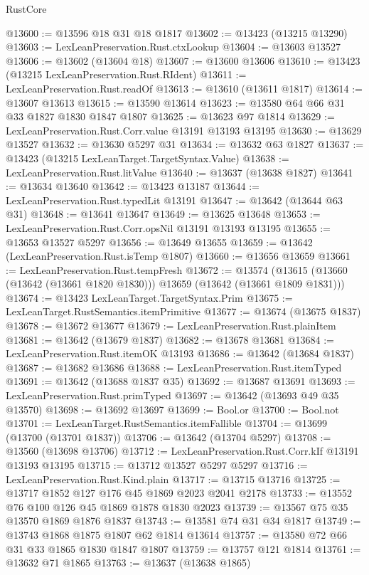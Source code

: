 \begin{lexlean}{RustCore}
\begin{coremodule}
@13600 := @13596 @18 @31 @18 @1817
@13602 := @13423 (@13215 @13290)
@13603 := LexLeanPreservation.Rust.ctxLookup
@13604 := @13603 @13527
@13606 := @13602 (@13604 @18)
@13607 := @13600 @13606
@13610 := @13423 (@13215 LexLeanPreservation.Rust.RIdent)
@13611 := LexLeanPreservation.Rust.readOf
@13613 := @13610 (@13611 @1817)
@13614 := @13607 @13613
@13615 := @13590 @13614
@13623 := @13580 @64 @66 @31 @33 @1827 @1830 @1847 @1807
@13625 := @13623 @97 @1814
@13629 := LexLeanPreservation.Rust.Corr.value @13191 @13193 @13195
@13630 := @13629 @13527
@13632 := @13630 @5297 @31
@13634 := @13632 @63 @1827
@13637 := @13423 (@13215 LexLeanTarget.TargetSyntax.Value)
@13638 := LexLeanPreservation.Rust.litValue
@13640 := @13637 (@13638 @1827)
@13641 := @13634 @13640
@13642 := @13423 @13187
@13644 := LexLeanPreservation.Rust.typedLit @13191
@13647 := @13642 (@13644 @63 @31)
@13648 := @13641 @13647
@13649 := @13625 @13648
@13653 := LexLeanPreservation.Rust.Corr.opsNil @13191 @13193 @13195
@13655 := @13653 @13527 @5297
@13656 := @13649 @13655
@13659 := @13642 (LexLeanPreservation.Rust.isTemp @1807)
@13660 := @13656 @13659
@13661 := LexLeanPreservation.Rust.tempFresh
@13672 := @13574
    (@13615 (@13660 (@13642 (@13661 @1820 @1830))) @13659 (@13642 (@13661 @1809 @1831)))
@13674 := @13423 LexLeanTarget.TargetSyntax.Prim
@13675 := LexLeanTarget.RustSemantics.itemPrimitive
@13677 := @13674 (@13675 @1837)
@13678 := @13672 @13677
@13679 := LexLeanPreservation.Rust.plainItem
@13681 := @13642 (@13679 @1837)
@13682 := @13678 @13681
@13684 := LexLeanPreservation.Rust.itemOK @13193
@13686 := @13642 (@13684 @1837)
@13687 := @13682 @13686
@13688 := LexLeanPreservation.Rust.itemTyped
@13691 := @13642 (@13688 @1837 @35)
@13692 := @13687 @13691
@13693 := LexLeanPreservation.Rust.primTyped
@13697 := @13642 (@13693 @49 @35 @13570)
@13698 := @13692 @13697
@13699 := Bool.or
@13700 := Bool.not
@13701 := LexLeanTarget.RustSemantics.itemFallible
@13704 := @13699 (@13700 (@13701 @1837))
@13706 := @13642 (@13704 @5297)
@13708 := @13560 (@13698 @13706)
@13712 := LexLeanPreservation.Rust.Corr.kIf @13191 @13193 @13195
@13715 := @13712 @13527 @5297 @5297
@13716 := LexLeanPreservation.Rust.Kind.plain
@13717 := @13715 @13716
@13725 := @13717 @1852 @127 @176 @45 @1869 @2023 @2041 @2178
@13733 := @13552 @76 @100 @126 @45 @1869 @1878 @1830 @2023
@13739 := @13567 @75 @35 @13570 @1869 @1876 @1837
@13743 := @13581 @74 @31 @34 @1817
@13749 := @13743 @1868 @1875 @1807 @62 @1814 @13614
@13757 := @13580 @72 @66 @31 @33 @1865 @1830 @1847 @1807
@13759 := @13757 @121 @1814
@13761 := @13632 @71 @1865
@13763 := @13637 (@13638 @1865)

\end{coremodule}
\end{lexlean}
